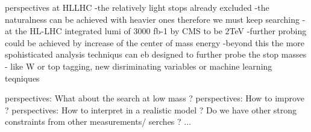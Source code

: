 perspectives at HLLHC
	-the relatively light stops already excluded
	-the naturalness can be achieved with heavier ones therefore we must keep searching
	-at the HL-LHC integrated lumi of 3000 fb-1 by CMS to be 2TeV
	-further probing could be achieved by increase of the center of mass energy
	-beyond this the more spohisticated analysis techniqus can eb designed to further probe the stop masses - like W or top tagging, new disriminating variables or machine learning teqniques

perspectives:	What about the search at low mass ?
perspectives:	How to improve ?
perspectives:	How to interpret in a realistic model ? Do we have other strong constraints from other measurements/ serches ? ...
